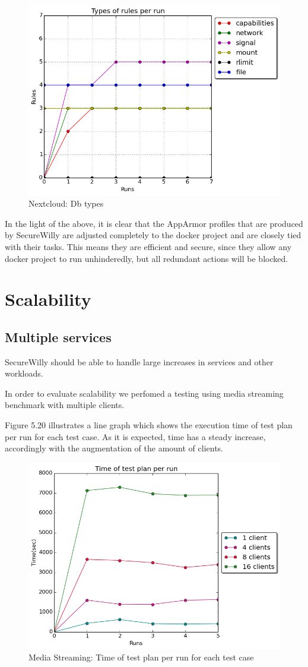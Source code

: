 \begin{figure}[h!]
  \centering
   \includegraphics[width=0.68\linewidth]{../figures/nextcloud/types_db.png}
   \caption{Nextcloud: Db types}
\end{figure}
In the light of the above, it is clear that the AppArmor profiles that are produced by SecureWilly are adjusted completely to the docker project and are closely tied with their tasks. This means they are efficient and secure, since they allow any docker project to run unhinderedly, but all redundant actions will be blocked.\\

\section{Scalability}
\subsection{Multiple services}
SecureWilly should be able to handle large increases in services and other workloads. 

In order to evaluate scalability we perfomed a testing using media streaming benchmark with multiple clients.

Figure 5.20 illustrates a line graph which shows the execution time of test plan per run for each test case. As it is expected, time has a steady increase, accordingly with the augmentation of the amount of clients.

\begin{figure}[h!]
  \centering
   \includegraphics[width=0.8\linewidth]{../figures/scalability/time1_4_8_16.png}
   \caption{Media Streaming: Time of test plan per run for each test case}
\end{figure}

